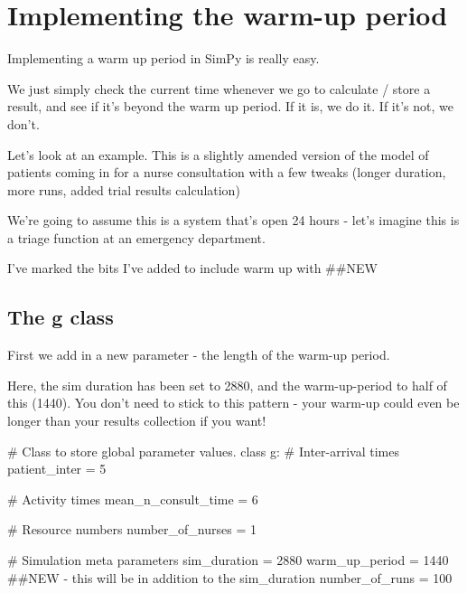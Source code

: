\documentclass[
  letterpaper,
  DIV=11,
  numbers=noendperiod]{scrreprt}
\newenvironment{Shaded}{\begin{snugshade}}{\end{snugshade}}
\newcommand{\CommentTok}[1]{\textcolor[rgb]{0.37,0.37,0.37}{#1}}
\newcommand{\DecValTok}[1]{\textcolor[rgb]{0.68,0.00,0.00}{#1}}
\newcommand{\KeywordTok}[1]{\textcolor[rgb]{0.00,0.23,0.31}{#1}}
\newcommand{\NormalTok}[1]{\textcolor[rgb]{0.00,0.23,0.31}{#1}}
\newcommand{\OperatorTok}[1]{\textcolor[rgb]{0.37,0.37,0.37}{#1}}
\begin{document}
\section{Implementing the warm-up
period}\label{implementing-the-warm-up-period}

Implementing a warm up period in SimPy is really easy.

We just simply check the current time whenever we go to calculate /
store a result, and see if it's beyond the warm up period. If it is, we
do it. If it's not, we don't.

Let's look at an example. This is a slightly amended version of the
model of patients coming in for a nurse consultation with a few tweaks
(longer duration, more runs, added trial results calculation)

We're going to assume this is a system that's open 24 hours - let's
imagine this is a triage function at an emergency department.

I've marked the bits I've added to include warm up with \#\#NEW

\subsection{The g class}\label{the-g-class-2}

First we add in a new parameter - the length of the warm-up period.

Here, the sim duration has been set to 2880, and the warm-up-period to
half of this (1440). You don't need to stick to this pattern - your
warm-up could even be longer than your results collection if you want!

\label{g_class}
\begin{Shaded}
\begin{Highlighting}[]
\CommentTok{\# Class to store global parameter values.}
\KeywordTok{class}\NormalTok{ g:}
    \CommentTok{\# Inter{-}arrival times}
\NormalTok{    patient\_inter }\OperatorTok{=} \DecValTok{5}

    \CommentTok{\# Activity times}
\NormalTok{    mean\_n\_consult\_time }\OperatorTok{=} \DecValTok{6}

    \CommentTok{\# Resource numbers}
\NormalTok{    number\_of\_nurses }\OperatorTok{=} \DecValTok{1}

    \CommentTok{\# Simulation meta parameters}
\NormalTok{    sim\_duration }\OperatorTok{=} \DecValTok{2880}
\NormalTok{    warm\_up\_period }\OperatorTok{=} \DecValTok{1440} \CommentTok{\#\#NEW {-} this will be in addition to the sim\_duration}
\NormalTok{    number\_of\_runs }\OperatorTok{=} \DecValTok{100}
\end{Highlighting}
\end{Shaded}
\end{document}
